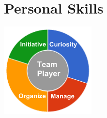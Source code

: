 \documentclass[]{deedy-resume-openfont}
\begin{document}
\begin{minipage}[t]{0.33\textwidth}
\section{ \textcolor{gray}{} Personal Skills}
\includegraphics[scale=0.80]{img/personal.png}\\
\sectionsep

\end{minipage}
\hfill
\end{document}
